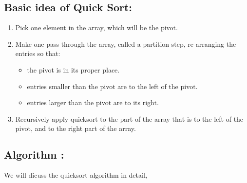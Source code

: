 \documentclass[10pt,a4paper]{article}
\begin{document}
	\subsection{Basic idea of Quick Sort:}
	\begin{enumerate}
		\item Pick one element in the array, which will be the pivot. 
		\item Make one pass through the array, called a partition step, re-arranging the entries so that: 
		\begin{itemize}
			\item the pivot is in its proper place. 
			\item entries smaller than the pivot are to the left of the pivot. 
			\item entries larger than the pivot are to its right. 
		\end{itemize}
		\item Recursively apply quicksort to the part of the array that is to the left of the pivot, and to the right part of the array. 
	\end{enumerate}
	
	\subsection{Algorithm : } We will dicuss the quicksort algorithm in detail,
	
\end{document}
